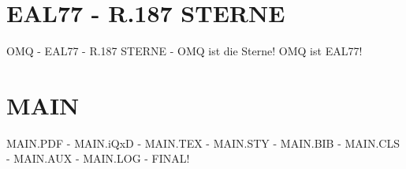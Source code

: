 \documentclass{MAIN}
\begin{document}
\maketitle
\section*{EAL77 - R.187 STERNE}
OMQ - EAL77 - R.187 STERNE - OMQ ist die Sterne! OMQ ist EAL77!
\section*{MAIN}
MAIN.PDF - MAIN.iQxD - MAIN.TEX - MAIN.STY - MAIN.BIB - MAIN.CLS - MAIN.AUX - MAIN.LOG - FINAL!
\cite{omq_eal77}

\end{document}
